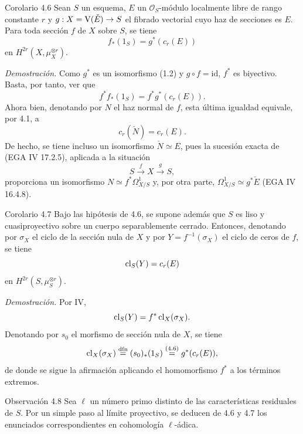 \begin{statement}{Corolario 4.6}
Sean $S$ un esquema, $E$ un $\mathcal O_S$-módulo localmente libre de rango constante $r$ y $g:X=\mathrm V(\check E)\to S$ el fibrado vectorial cuyo haz de secciones es $E$. Para toda sección $f$ de $X$ sobre $S$, se tiene
\[
f_*(1_S)=g^*(c_r(E))
\]
en $H^{2r}(X,\mu_X^{\otimes r})$.
\end{statement}

\emph{Demostración.} Como $g^*$ es un isomorfismo (1.2) y $g\circ f=\mathrm{id}$, $f^*$ es biyectivo. Basta, por tanto, ver que
\[
f^*f_*(1_S)=f^*g^*(c_r(E)).
\]
Ahora bien, denotando por $N$ el haz normal de $f$, esta última igualdad equivale, por 4.1, a
\[
c_r(\check N)=c_r(E).
\]
De hecho, se tiene incluso un isomorfismo $\check N\simeq E$, pues la sucesión exacta de (EGA IV 17.2.5), aplicada a la situación
\[
S\xrightarrow{f} X\xrightarrow{g} S,
\]
proporciona un isomorfismo $N\simeq f^*\Omega^1_{X/S}$ y, por otra parte, $\Omega^1_{X/S}\simeq g^*\check E$ (EGA IV 16.4.8).

\begin{statement}{Corolario 4.7}
Bajo las hipótesis de 4.6, se supone además que $S$ es liso y cuasiproyectivo sobre un cuerpo separablemente cerrado. Entonces, denotando por $\sigma_X$ el ciclo de la sección nula de $X$ y por $Y=f^{-1}(\sigma_X)$ el ciclo de ceros de $f$, se tiene
\[
\operatorname{cl}_S(Y)=c_r(E)
\]
en $H^{2r}(S,\mu_S^{\otimes r})$.
\end{statement}

\emph{Demostración.} Por IV,
\[
\operatorname{cl}_S(Y)=f^*\operatorname{cl}_X(\sigma_X).
\]
Denotando por $s_0$ el morfismo de sección nula de $X$, se tiene
\[
\operatorname{cl}_X(\sigma_X)\stackrel{\mathrm{dfn}}{=}(s_0)_*(1_S)\stackrel{(4.6)}{=}g^*(c_r(E)),
\]
de donde se sigue la afirmación aplicando el homomorfismo $f^*$ a los términos extremos.

\begin{statement}{Observación 4.8}
Sea $\ell$ un número primo distinto de las características residuales de $S$. Por un simple paso al límite proyectivo, se deducen de 4.6 y 4.7 los enunciados correspondientes en cohomología $\ell$-ádica.
\end{statement}

